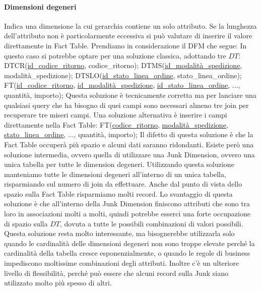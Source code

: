 \paragraph{Dimensioni degeneri}
Indica una dimensione la cui gerarchia contiene un solo attributo. Se la lunghezza dell'attributo non è particolarmente eccessiva si può valutare di inserire il valore direttamente in Fact Table. Prendiamo in considerazione il DFM che segue:
\noindent In questo caso si potrebbe optare per una soluzione classica, adottando tre $DT$:\newline\newline
DTCR(\underline{id\_codice\_ritorno}, codice\_ritorno);\newline
DTMS(\underline{id\_modalità\_spedizione}, modalità\_spedizione);\newline
DTSLO(\underline{id\_stato\_linea\_ordine}, stato\_linea\_ordine);\newline
FT(\underline{id\_codice\_ritorno}, \underline{id\_modalità\_spedizione}, \underline{id\_stato\_linea\_ordine}, ..., quantità, importo);\newline\newline
Questa soluzione è tecnicamente corretta ma per lanciare una qualsiasi query che ha bisogno di quei campi sono necessari almeno tre join per recuperare tre miseri campi. Una soluzione alternativa è inserire i campi direttamente nella Fact Table:\newline\newline
FT(\underline{codice\_ritorno}, \underline{modalità\_spedizione}, \underline{stato\_linea\_ordine}, ..., quantità, importo);\newline
Il difetto di questa soluzione è che la Fact Table occuperà più spazio e alcuni dati saranno ridondanti.\newline
Esiste però una soluzione intermedia, ovvero quella di utilizzare una Junk Dimension, ovvero una unica tabella per tutte le dimension degeneri.
\noindent Utilizzando questa soluzione manteniamo tutte le dimensioni degeneri all'interno di un unica tabella, risparmiando sul numero di join da effettuare. Anche dal punto di vista dello spazio sulla Fact Table risparmiamo molti record. Lo svantaggio di questa soluzione è che all'interno della Junk Dimension finiscono attributi che sono tra loro in associazioni molti a molti, quindi potrebbe esserci una forte occupazione di spazio sulla $DT$, dovuta a tutte le possibili combinazioni di valori possibili. Questa soluzione resta molto interessante, ma bisognerebbe utilizzarla solo quando le cardinalità delle dimensioni degeneri non sono troppe elevate perché la cardinalità della tabella cresce esponenzialmente, o quando le regole di business impediscono moltissime combinazioni degli attributi. Inoltre c'è un ulteriore livello di flessibilità, perché può essere che alcuni record sulla Junk siano utilizzato molto più spesso di altri.
